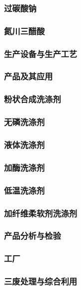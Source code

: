 \documentclass[UTF8]{../../ApplicationUniverse}
\begin{document}
    \subsubsection{过碳酸钠}
    \subsubsection{氮川三醋酸}
\subsubsection{生产设备与生产工艺}
\subsubsection{产品及其应用}
    \subsubsection{粉状合成洗涤剂}
    \subsubsection{无磷洗涤剂}
    \subsubsection{液体洗涤剂}
    \subsubsection{加酶洗涤剂}
    \subsubsection{低温洗涤剂}
    \subsubsection{加纤维柔软剂洗涤剂}
\subsubsection{产品分析与检验}
\subsubsection{工厂}
\subsubsection{三废处理与综合利用}
\end{document}
